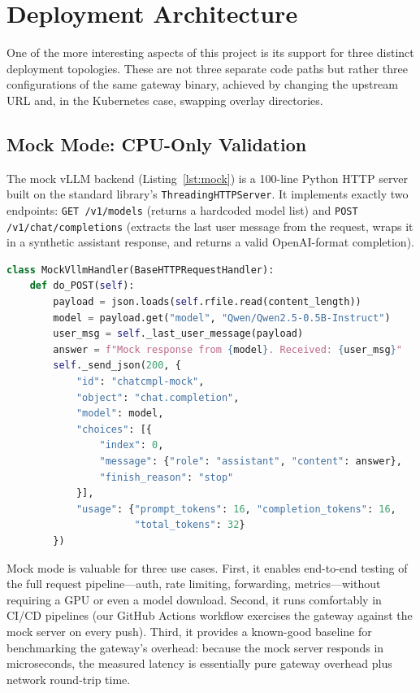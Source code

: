 \documentclass[10pt,journal]{IEEEtran}
\begin{document}
\section{Deployment Architecture}\label{sec:deployment}

One of the more interesting aspects of this project is its support for three distinct deployment topologies. These are not three separate code paths but rather three configurations of the same gateway binary, achieved by changing the upstream URL and, in the Kubernetes case, swapping overlay directories.

\subsection{Mock Mode: CPU-Only Validation}

The mock vLLM backend (Listing~\ref{lst:mock}) is a 100-line Python HTTP server built on the standard library's \texttt{ThreadingHTTPServer}. It implements exactly two endpoints: \texttt{GET /v1/models} (returns a hardcoded model list) and \texttt{POST /v1/chat/completions} (extracts the last user message from the request, wraps it in a synthetic assistant response, and returns a valid OpenAI-format completion).

\begin{lstlisting}[language=Python, caption={Mock vLLM server (simplified from \texttt{mock-vllm/server.py}).}, label={lst:mock}]
class MockVllmHandler(BaseHTTPRequestHandler):
    def do_POST(self):
        payload = json.loads(self.rfile.read(content_length))
        model = payload.get("model", "Qwen/Qwen2.5-0.5B-Instruct")
        user_msg = self._last_user_message(payload)
        answer = f"Mock response from {model}. Received: {user_msg}"
        self._send_json(200, {
            "id": "chatcmpl-mock",
            "object": "chat.completion",
            "model": model,
            "choices": [{
                "index": 0,
                "message": {"role": "assistant", "content": answer},
                "finish_reason": "stop"
            }],
            "usage": {"prompt_tokens": 16, "completion_tokens": 16,
                      "total_tokens": 32}
        })
\end{lstlisting}

Mock mode is valuable for three use cases. First, it enables end-to-end testing of the full request pipeline---auth, rate limiting, forwarding, metrics---without requiring a GPU or even a model download. Second, it runs comfortably in CI/CD pipelines (our GitHub Actions workflow exercises the gateway against the mock server on every push). Third, it provides a known-good baseline for benchmarking the gateway's overhead: because the mock server responds in microseconds, the measured latency is essentially pure gateway overhead plus network round-trip time.
\end{document}
